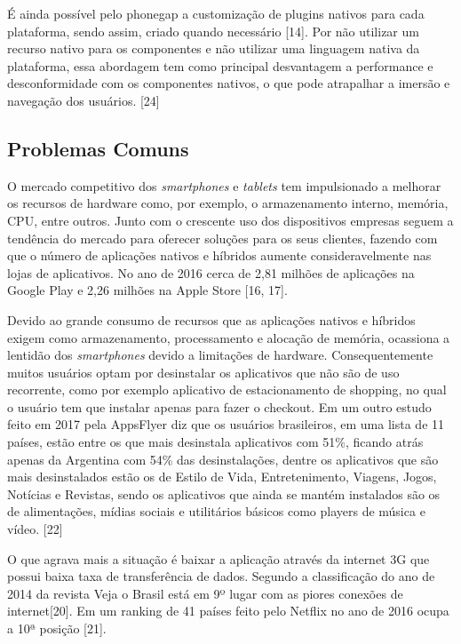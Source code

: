 É ainda possível pelo phonegap a customização de plugins nativos para cada plataforma, sendo assim, criado quando necessário [14]. Por não utilizar um recurso nativo para os componentes e não utilizar uma linguagem nativa da plataforma, essa abordagem tem como principal desvantagem a performance e desconformidade com os componentes nativos, o que pode atrapalhar a imersão e navegação dos usuários. [24]

\subsection{\esp Problemas Comuns}

O mercado competitivo dos \textit{smartphones} e \textit{tablets} tem impulsionado a melhorar os recursos de hardware como, por exemplo, o armazenamento interno, memória, CPU, entre outros. Junto com o crescente uso dos dispositivos empresas seguem a tendência do mercado para oferecer soluções para os seus clientes, fazendo com que o número de aplicações nativos e híbridos aumente consideravelmente nas lojas de aplicativos. No ano de 2016 cerca de 2,81 milhões de aplicações na Google Play e 2,26 milhões na Apple Store [16, 17].

Devido ao grande consumo de recursos que as aplicações nativos e híbridos exigem como armazenamento, processamento e alocação de memória, ocassiona a lentidão dos \textit{smartphones} devido a limitações de hardware. Consequentemente muitos usuários optam por desinstalar os aplicativos que não são de uso recorrente, como por exemplo aplicativo de estacionamento de shopping, no qual o usuário tem que instalar apenas para fazer o checkout. Em um outro estudo feito em 2017 pela AppsFlyer diz que os usuários brasileiros, em uma lista de 11 países, estão entre os que mais desinstala aplicativos com 51\%, ficando atrás apenas da Argentina com 54\% das desinstalações, dentre os aplicativos que são mais desinstalados estão os de Estilo de Vida, Entretenimento, Viagens, Jogos, Notícias e Revistas, sendo os aplicativos que ainda se mantém instalados são os de alimentações, mídias sociais e utilitários básicos como players de música e vídeo. [22]

O que agrava mais a situação é baixar a aplicação através da internet 3G que possui baixa taxa de transferência de dados. Segundo a classificação do ano de 2014 da revista Veja o Brasil está em 9º lugar com as piores conexões de internet[20]. Em um ranking de 41 países feito pelo Netflix no ano de 2016 ocupa a 10ª posição [21].


